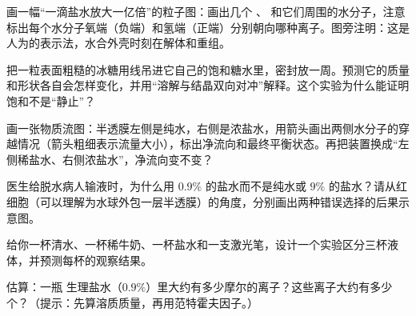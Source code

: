 \begin{sikaoti}
\item 画一幅“一滴盐水放大一亿倍”的粒子图：画出几个 、 和它们周围的水分子，注意标出每个水分子氧端（负端）和氢端（正端）分别朝向哪种离子。图旁注明：这是人为的表示法，水合外壳时刻在解体和重组。
\item 把一粒表面粗糙的冰糖用线吊进它自己的饱和糖水里，密封放一周。预测它的质量和形状各自会怎样变化，并用“溶解与结晶双向对冲”解释。这个实验为什么能证明饱和不是“静止”？
\item 画一张物质流图：半透膜左侧是纯水，右侧是浓盐水，用箭头画出两侧水分子的穿越情况（箭头粗细表示流量大小），标出净流向和最终平衡状态。再把装置换成“左侧稀盐水、右侧浓盐水”，净流向变不变？
\item 医生给脱水病人输液时，为什么用 $0.9\%$ 的盐水而不是纯水或 $9\%$ 的盐水？请从红细胞（可以理解为水球外包一层半透膜）的角度，分别画出两种错误选择的后果示意图。
\item 给你一杯清水、一杯稀牛奶、一杯盐水和一支激光笔，设计一个实验区分三杯液体，并预测每杯的观察结果。
\item 估算：一瓶  生理盐水（$0.9\%$）里大约有多少摩尔的离子？这些离子大约有多少个？（提示：先算溶质质量，再用范特霍夫因子。）
\end{sikaoti}
